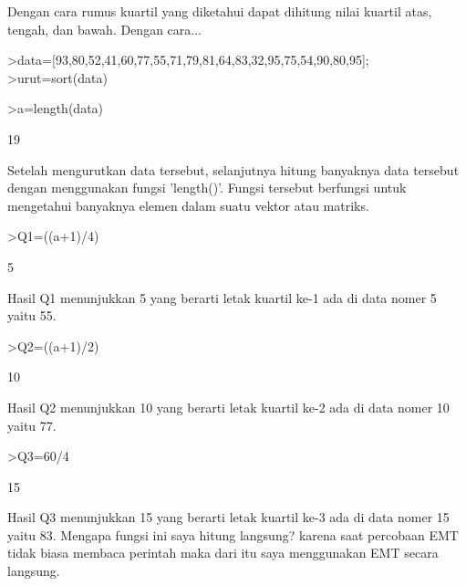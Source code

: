 \documentclass[a4paper,10pt]{article}
\begin{document}
\begin{eulernotebook}
\begin{eulercomment}
\begin{eulercomment}
\begin{eulercomment}
Dengan cara rumus kuartil yang diketahui dapat dihitung nilai kuartil
atas, tengah, dan bawah. Dengan cara...
\end{eulercomment}
\begin{eulerprompt}
>data=[93,80,52,41,60,77,55,71,79,81,64,83,32,95,75,54,90,80,95];
>urut=sort(data)
\end{eulerprompt}
\begin{euleroutput}
  [32,  41,  52,  54,  55,  60,  64,  71,  75,  77,  79,  80,  80,  81,
  83,  90,  93,  95,  95]
\end{euleroutput}
\begin{eulerprompt}
>a=length(data)
\end{eulerprompt}
\begin{euleroutput}
  19
\end{euleroutput}
\begin{eulercomment}
Setelah mengurutkan data tersebut, selanjutnya hitung banyaknya data
tersebut dengan menggunakan fungsi 'length()'. Fungsi tersebut
berfungsi untuk mengetahui banyaknya elemen dalam suatu vektor atau
matriks. 
\end{eulercomment}
\begin{eulerprompt}
>Q1=((a+1)/4)
\end{eulerprompt}
\begin{euleroutput}
  5
\end{euleroutput}
\begin{eulercomment}
Hasil Q1 menunjukkan 5 yang berarti letak kuartil ke-1 ada di data
nomer 5 yaitu 55.
\end{eulercomment}
\begin{eulerprompt}
>Q2=((a+1)/2)
\end{eulerprompt}
\begin{euleroutput}
  10
\end{euleroutput}
\begin{eulercomment}
Hasil Q2 menunjukkan 10 yang berarti letak kuartil ke-2 ada di data
nomer 10 yaitu 77.
\end{eulercomment}
\begin{eulerprompt}
>Q3=60/4
\end{eulerprompt}
\begin{euleroutput}
  15
\end{euleroutput}
\begin{eulercomment}
Hasil Q3 menunjukkan 15 yang berarti letak kuartil ke-3 ada di data
nomer 15 yaitu 83. Mengapa fungsi ini saya hitung langsung? karena
saat percobaan EMT tidak biasa membaca perintah maka dari itu saya
menggunakan EMT secara langsung.



\end{eulercomment}
\end{eulercomment}
\end{eulercomment}
\end{eulernotebook}
\end{document}
